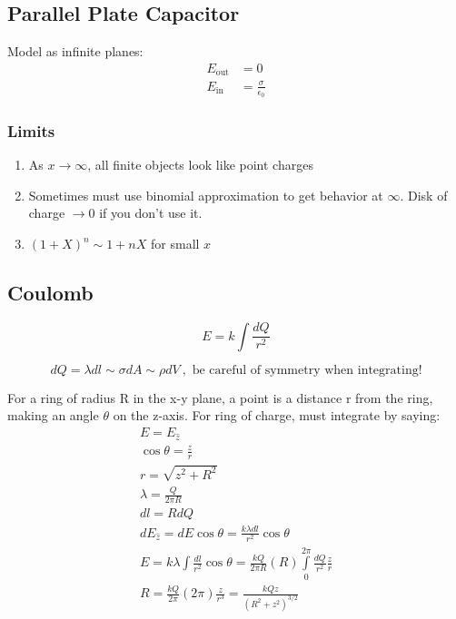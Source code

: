 \documentclass[10pt,letter]{article}
\begin{document}
\subsection{Parallel Plate Capacitor}
Model as infinite planes: 
\begin{align}
 E_{\textrm{out}}  &= 0\\
 E_{\textrm{in}} &= \frac{\sigma}{\epsilon_0}
\end{align}

\subsubsection{Limits}
\begin{enumerate}
    \item As $x \rightarrow \infty$, all finite objects look like point charges
    \item Sometimes must use binomial approximation to get behavior at $\infty$. Disk of charge $\rightarrow 0$ if you don't use it.
    \item $(1+X)^n \sim 1+ nX$ for small $x$
\end{enumerate}

\subsection{Coulomb}
\begin{equation}
 E = k \int \frac{dQ}{r^2} 
\end{equation}

\begin{equation}
  dQ = \lambda dl \sim \sigma dA \sim \rho dV~, \textrm{ be careful of symmetry when integrating!}
\end{equation}

For a ring of radius R in the x-y plane, a point is a distance r from the ring, making an angle $\theta$ on the z-axis. For ring of charge, must integrate by saying:
\begin{align}
 E = E_{\hat{z}}\\
 \cos \theta = \frac{z}{r}\\
 r = \sqrt{z^2 + R^2}\\
 \lambda = \frac{Q}{2 \pi R}\\
dl = R dQ\\
dE_{\hat{z}} = dE\cos \theta = \frac{k \lambda dl}{r^2}\cos\theta\\
E = k \lambda \int \frac{dl}{r^2}\cos \theta = \frac{kQ}{2 \pi R}(R) \int \limits_0^{2\pi} \frac{dQ}{r^2}\frac{z}{r}\\
R = \frac{kQ}{2\pi}(2\pi) \frac{z}{r^3} = \frac{kQz}{(R^2 + z^2)^{3/2}}
\end{align}
\end{document}
